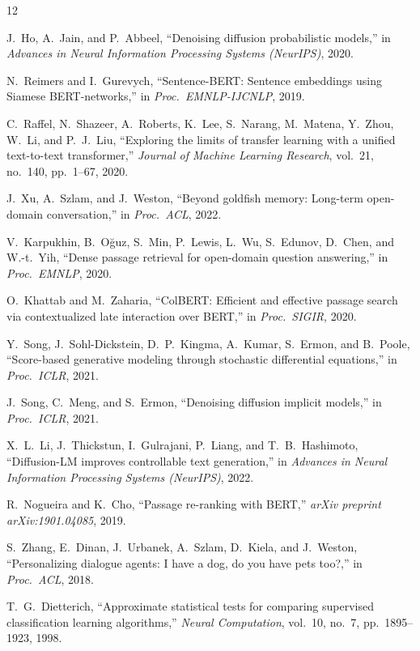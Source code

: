 \documentclass{article}
\begin{document}
\begin{thebibliography}{12}

J.~Ho, A.~Jain, and P.~Abbeel, ``Denoising diffusion probabilistic models,'' in \emph{Advances in Neural Information Processing Systems (NeurIPS)}, 2020.

N.~Reimers and I.~Gurevych, ``Sentence-BERT: Sentence embeddings using Siamese BERT-networks,'' in \emph{Proc.\ EMNLP-IJCNLP}, 2019.

C.~Raffel, N.~Shazeer, A.~Roberts, K.~Lee, S.~Narang, M.~Matena, Y.~Zhou, W.~Li, and P.~J.~Liu, ``Exploring the limits of transfer learning with a unified text-to-text transformer,'' \emph{Journal of Machine Learning Research}, vol.~21, no.~140, pp.~1--67, 2020.

J.~Xu, A.~Szlam, and J.~Weston, ``Beyond goldfish memory: Long-term open-domain conversation,'' in \emph{Proc.\ ACL}, 2022.

V.~Karpukhin, B.~O\u{g}uz, S.~Min, P.~Lewis, L.~Wu, S.~Edunov, D.~Chen, and W.-t.~Yih, ``Dense passage retrieval for open-domain question answering,'' in \emph{Proc.\ EMNLP}, 2020.

O.~Khattab and M.~Zaharia, ``ColBERT: Efficient and effective passage search via contextualized late interaction over BERT,'' in \emph{Proc.\ SIGIR}, 2020.

Y.~Song, J.~Sohl-Dickstein, D.~P.~Kingma, A.~Kumar, S.~Ermon, and B.~Poole, ``Score-based generative modeling through stochastic differential equations,'' in \emph{Proc.\ ICLR}, 2021.

J.~Song, C.~Meng, and S.~Ermon, ``Denoising diffusion implicit models,'' in \emph{Proc.\ ICLR}, 2021.

X.~L.~Li, J.~Thickstun, I.~Gulrajani, P.~Liang, and T.~B.~Hashimoto, ``Diffusion-LM improves controllable text generation,'' in \emph{Advances in Neural Information Processing Systems (NeurIPS)}, 2022.

R.~Nogueira and K.~Cho, ``Passage re-ranking with BERT,'' \emph{arXiv preprint arXiv:1901.04085}, 2019.

S.~Zhang, E.~Dinan, J.~Urbanek, A.~Szlam, D.~Kiela, and J.~Weston, ``Personalizing dialogue agents: I have a dog, do you have pets too?,'' in \emph{Proc.\ ACL}, 2018.

T.~G.~Dietterich, ``Approximate statistical tests for comparing supervised classification learning algorithms,'' \emph{Neural Computation}, vol.~10, no.~7, pp.~1895--1923, 1998.

\end{thebibliography}
\end{document}
